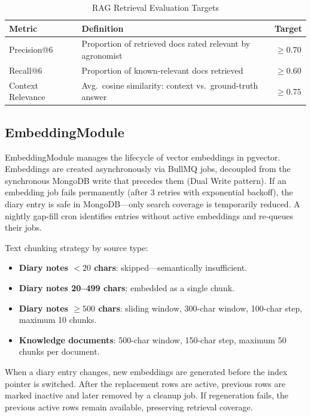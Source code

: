 \documentclass[conference]{IEEEtran}
\begin{document}
\begin{table}[htbp]
\caption{RAG Retrieval Evaluation Targets}
\label{tab:rag_eval}
\centering
\begin{tabular}{lp{3.2cm}c}
\toprule
\textbf{Metric} & \textbf{Definition} & \textbf{Target} \\
\midrule
Precision@6 & Proportion of retrieved docs rated relevant by agronomist & $\geq 0.70$ \\
Recall@6 & Proportion of known-relevant docs retrieved & $\geq 0.60$ \\
Context Relevance & Avg.\ cosine similarity: context vs.\ ground-truth answer & $\geq 0.75$ \\
\bottomrule
\end{tabular}
\end{table}

\subsection{EmbeddingModule}

EmbeddingModule manages the lifecycle of vector embeddings in pgvector. Embeddings are created asynchronously via BullMQ jobs, decoupled from the synchronous MongoDB write that precedes them (Dual Write pattern). If an embedding job fails permanently (after 3 retries with exponential backoff), the diary entry is safe in MongoDB---only search coverage is temporarily reduced. A nightly gap-fill cron identifies entries without active embeddings and re-queues their jobs.

Text chunking strategy by source type:

\begin{itemize}
    \item \textbf{Diary notes $< 20$ chars}: skipped---semantically insufficient.
    \item \textbf{Diary notes 20--499 chars}: embedded as a single chunk.
    \item \textbf{Diary notes $\geq 500$ chars}: sliding window, 300-char window, 100-char step, maximum 10 chunks.
    \item \textbf{Knowledge documents}: 500-char window, 150-char step, maximum 50 chunks per document.
\end{itemize}

When a diary entry changes, new embeddings are generated before the index pointer is switched. After the replacement rows are active, previous rows are marked inactive and later removed by a cleanup job. If regeneration fails, the previous active rows remain available, preserving retrieval coverage.
\end{document}
